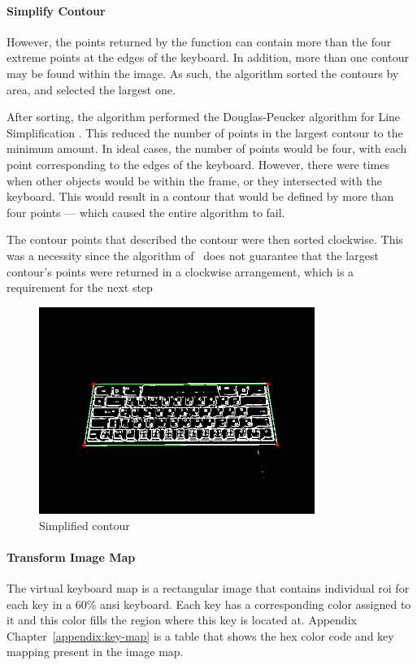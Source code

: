 \documentclass{report}
\begin{document}
\paragraph{Simplify Contour}
However, the points returned by the function can contain more than the four
extreme points at the edges of the keyboard. In addition, more than one contour
may be found within the image. As such, the algorithm sorted the contours by
area, and selected the largest one.

After sorting, the algorithm performed the Douglas-Peucker algorithm for Line
Simplification \parencite{douglas-peucker}. This reduced the number of points in
the largest contour to the minimum amount. In ideal cases, the number of points
would be four, with each point corresponding to the edges of the keyboard.
However, there were times when other objects would be within the frame, or they
intersected with the keyboard. This would result in a contour that would be
defined by more than four points --- which caused the entire algorithm to fail.

The contour points that described the contour were then sorted clockwise. This
was a necessity since the algorithm of~\cite{contours} does not guarantee that
the largest contour's points were returned in a clockwise arrangement, which is
a requirement for the next step

\begin{figure}[H]
	\centering
	\includegraphics[width=0.8\textwidth]{get-largest-contour.png}
	\caption{Simplified contour}
	\centering
\end{figure}


\paragraph{Transform Image Map}
The virtual keyboard map is a rectangular image that contains individual
\ac{roi} for each key in a 60\% \ac{ansi} keyboard. Each key has a corresponding
color assigned to it and this color fills the region where this key is located
at. Appendix Chapter~\ref{appendix:key-map} is a table that shows the hex color
code and key mapping present in the image map.
\end{document}
